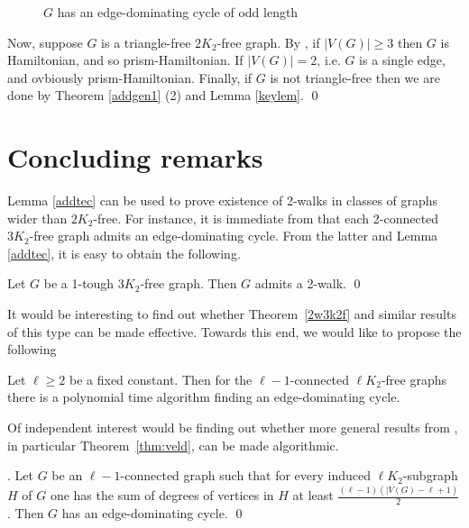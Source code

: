 \documentclass[runningheads,a4paper]{llncs}
\begin{document}
\begin{figure}[h]
\begin{center}
\end{center}
\caption{$G$ has an edge-dominating cycle of odd length}\label{fig2}
\end{figure}

Now, suppose $G$ is a triangle-free $2K_2$-free graph. By \cite[Theorem 4]{broersma2014toughness},
if $|V(G)|\geq 3$ then 
$G$ is Hamiltonian, and so prism-Hamiltonian.
If $|V(G)|=2$, i.e. $G$ is a single edge, and ovbiously prism-Hamiltonian.
Finally, if $G$ is not triangle-free then we are done by 
Theorem \ref{addgen1} (2) and Lemma \ref{keylem}.
\qed

\section{Concluding remarks}

Lemma \ref{addtec} can be used to prove existence of 2-walks in 
classes of graphs wider than $2K_2$-free.
For instance, it is immediate from \cite[Corollary 3.2]{veldman83} that each 2-connected
$3K_2$-free graph admits  an edge-dominating cycle. From the latter and Lemma \ref{addtec},
it is easy to obtain the following.
\begin{theorem}\label{2w3k2f}
Let $G$ be a 1-tough $3K_2$-free graph. Then $G$ admits a 2-walk. \qed
\end{theorem}

It would be interesting to find out whether Theorem~\ref{2w3k2f} and similar results
of this type can be made
effective. Towards this end, we would like to propose the following
\begin{conjecture}
Let $\ell\geq 2$ be a fixed constant. 
Then for the $\ell-1$-connected $\ell K_2$-free
graphs there is a polynomial time algorithm finding an edge-dominating cycle.
\end{conjecture}

Of independent interest would be finding out whether more general results from \cite{veldman83}, 
in particular Theorem~\ref{thm:veld}, can be made algorithmic. 
\begin{theorem}\label{thm:veld}
{\rm \cite[Theorem~3]{veldman83}.} Let $G$ be an $\ell-1$-connected graph such that
for every induced $\ell K_2$-subgraph $H$ of $G$ one has the
sum of degrees of vertices in $H$ at least $\frac{(\ell-1)(|V(G)-\ell +1)}{2}$.
Then $G$ has  an edge-dominating cycle. \qed
\end{theorem}
\end{document}
